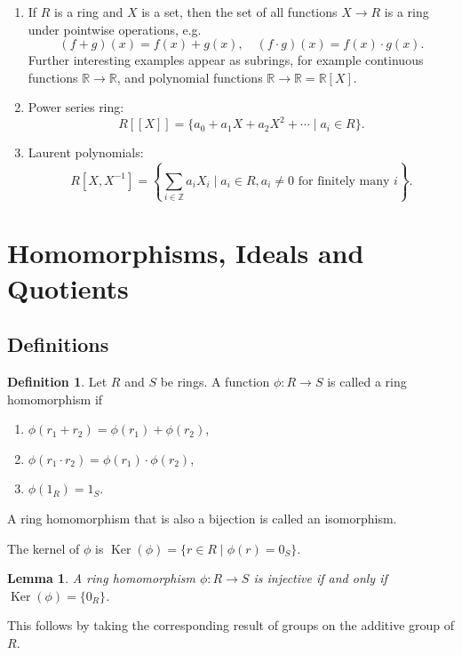 \documentclass[12pt]{article}
\DeclareMathOperator{\Ker}{Ker}
\newtheorem{lemma}{Lemma}[section]
\theoremstyle{definition}
\newtheorem{definition}{Definition}[section]
\theoremstyle{remark}
\begin{document}
\begin{enumerate}[resume*]
	\item If $R$ is a ring and $X$ is a set, then the set of all functions $X \to R$ is a ring under pointwise operations, e.g.
		\[
			(f + g)(x) = f(x) + g(x), \quad (f \cdot g)(x) = f(x) \cdot g(x)
		.\]
		Further interesting examples appear as subrings, for example continuous functions $\mathbb{R} \to \mathbb{R}$, and polynomial functions $\mathbb{R} \to \mathbb{R} = \mathbb{R}[X]$.
	\item Power series ring:
		\[
			R[[X]] = \{a_0 + a_1X + a_2X^2 + \cdots \mid a_i \in R\}
		.\]
	\item Laurent polynomials:
		\[
			R[X, X^{-1}] = \left\{ \sum_{i \in \mathbb{Z}} a_i X_i \mid a_i \in R, a_i \neq 0 \text{ for finitely many } i\right\}
		.\]
\end{enumerate}

\newpage

\section{Homomorphisms, Ideals and Quotients}%
\label{sec:homomorphisms_ideals_and_quotients}

\subsection{Definitions}%
\label{sub:definitions}

\begin{definition}
	Let $R$ and $S$ be rings. A function $\phi : R \to S$ is called a ring homomorphism if
	\begin{enumerate}[label = (\roman*)]
		\item $\phi(r_1 + r_2) = \phi(r_1) + \phi(r_2)$,
		\item $\phi(r_1 \cdot r_2) = \phi(r_1)\cdot\phi(r_2)$,
		\item $\phi(1_{R}) = 1_{S}$.
	\end{enumerate}
	A ring homomorphism that is also a bijection is called an isomorphism.

	The kernel of $\phi$ is $\Ker(\phi) = \{r \in R \mid \phi(r) = 0_{S}\}$.
\end{definition}

\begin{lemma}
	A ring homomorphism $\phi : R \to S$ is injective if and only if $\Ker(\phi) = \{0_{R}\}$.
\end{lemma}
This follows by taking the corresponding result of groups on the additive group of $R$.
\end{document}
